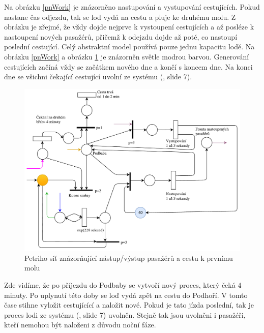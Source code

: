 \documentclass[11pt,a4paper]{article}
\begin{document}
	\newpage
	Na obrázku \ref{pnWork} je znázorněno nastupování a vystupování cestujících. Pokud nastane čas
	odjezdu, tak se loď vydá na cestu a pluje ke druhému molu. Z obrázku je zřejmé, že vždy dojde
	nejprve k vystoupení cestujících a až posléze k nastoupení nových pasažérů, přičemž k odejzdu
	dojde až poté, co nastoupí poslední cestující. Celý abstraktní model používá pouze jednu kapacitu lodě.
	Na obrázku \ref{pnWork} a obrázku \ref{pnWork2} je znázorněn světle modrou barvou.
	Generování cestujících začíná vždy se začátkem nového dne a končí s koncem dne.
	Na konci dne se všichni čekající cestující uvolní ze systému (\cite{SLAJD}, slide 7).

	\begin{figure}[h]
		\centering
		\includegraphics[scale=0.7, width=\textwidth]{pn-work2.pdf}
		\caption{Petriho síť znázorňující nástup/výstup pasažérů a cestu k prvnímu molu}
		\label{pnWork2}
	\end{figure}
	Zde vidíme, že po příjezdu do Podbaby se vytvoří nový proces, který čeká 4 minuty.
	Po uplynutí této doby se loď vydá zpět na cestu do Podhoří. V tomto čase stihne vyložit
	cestujícící a naložit nové. Pokud je tato jízda poslední, tak je proces lodi ze systému (\cite{SLAJD}, slide 7) uvolněn.
	Stejně tak jsou uvolněni i pasažéři, kteří nemohou být naloženi z důvodu noční fáze.

 \newpage
\end{document}
